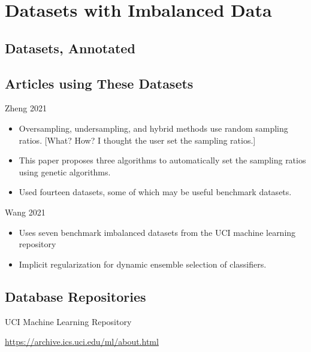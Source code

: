 \section{Datasets with Imbalanced Data}

\subsection{Datasets, Annotated}

\subsection{Articles using These Datasets}

Zheng 2021 \cite{ZHENG_2021}

\begin{itemize}
	\item Oversampling, undersampling, and hybrid methods use random sampling ratios.  [What?  How?  I thought the user set the sampling ratios.]
	\item This paper proposes three algorithms to automatically set the sampling ratios using genetic algorithms.  	
	\item Used fourteen datasets, some of which may be useful benchmark datasets.
\end{itemize}

Wang 2021 \cite{WANG_2021}

\begin{itemize}
	\item Uses seven benchmark imbalanced datasets from the UCI machine learning repository
	\item Implicit regularization for dynamic ensemble selection of classifiers.
\end{itemize}

\subsection{Database Repositories}

UCI Machine Learning Repository

\url{https://archive.ics.uci.edu/ml/about.html}

